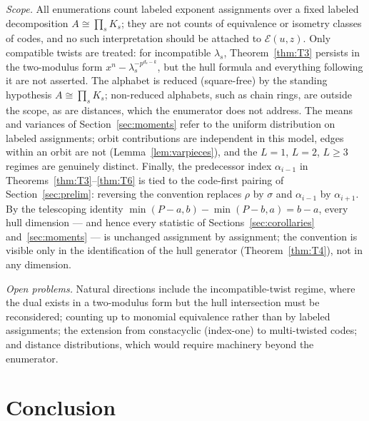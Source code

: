 \documentclass[11pt]{article}
\theoremstyle{definition}
\theoremstyle{remark}
\begin{document}
\emph{Scope.} All enumerations count labeled exponent assignments over
a fixed labeled decomposition \(A \cong \prod_s K_s\); they are not
counts of equivalence or isometry classes of codes, and no such
interpretation should be attached to \(\mathcal{E}(u,z)\). Only
compatible twists are treated: for incompatible \(\lambda_s\),
Theorem~\ref{thm:T3} persists in the two-modulus form
\(x^n - \lambda_s^{-p^{d_s-k}}\), but the hull formula and everything
following it are not asserted. The alphabet is reduced (square-free) by
the standing hypothesis \(A \cong \prod_s K_s\); non-reduced alphabets,
such as chain rings, are outside the scope, as are distances, which the
enumerator does not address. The means and variances of
Section~\ref{sec:moments} refer to the uniform distribution on labeled
assignments; orbit contributions are independent in this model, edges
within an orbit are not (Lemma~\ref{lem:varpieces}), and the \(L=1\),
\(L=2\), \(L\ge3\) regimes are genuinely distinct. Finally, the
predecessor index \(\alpha_{i-1}\) in
Theorems~\ref{thm:T3}--\ref{thm:T6} is tied to the code-first pairing of
Section~\ref{sec:prelim}: reversing the convention replaces \(\rho\) by
\(\sigma\) and \(\alpha_{i-1}\) by \(\alpha_{i+1}\). By the telescoping
identity \(\min(P-a,b) - \min(P-b,a) = b - a\), every hull dimension ---
and hence every statistic of Sections~\ref{sec:corollaries}
and~\ref{sec:moments} --- is unchanged assignment by assignment; the
convention is visible only in the identification of the hull generator
(Theorem~\ref{thm:T4}), not in any dimension.

\emph{Open problems.} Natural directions include the incompatible-twist
regime, where the dual exists in a two-modulus form but the hull
intersection must be reconsidered; counting up to monomial equivalence
rather than by labeled assignments; the extension from constacyclic
(index-one) to multi-twisted codes; and distance distributions, which
would require machinery beyond the enumerator.

\section{Conclusion}
\end{document}
